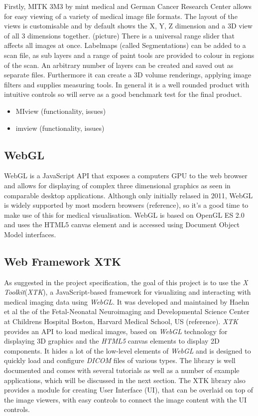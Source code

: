 \documentclass[a4paper,11pt,titlepage]{article}
\begin{document}
     Firstly, MITK 3M3 by mint medical and German Cancer Research Center allows for easy viewing of a variety of medical image file formats. The layout of the views is customisable and by default shows the X, Y, Z dimension and a 3D view of all 3 dimensions together. (picture) There is a universal range slider that affects all images at once. Labelmaps (called Segmentations) can be added to a scan file, as sub layers and a range of paint tools are provided to colour in regions of the scan. An arbitrary number of layers can be created and saved out as separate files. 
     Furthermore it can create a 3D volume renderings, applying image filters and supplies measuring tools. In general it is a well rounded product with intuitive controls so will serve as a good benchmark test for the final product.
    \begin{itemize}
\item MIview (functionality, issues)
\item imview (functionality, issues)
\end{itemize}


\subsection{WebGL}

WebGL is a JavaScript API that exposes a computers GPU to the web browser and allows for displaying of complex three dimensional graphics as seen in comparable desktop applications. Although only initially relased in 2011, WebGL is widely supported by most modern browsers (reference), so it's a good time to make use of this for medical visualisation. WebGL is based on OpenGL ES 2.0 and uses the HTML5 canvas element and is accessed using Document Object Model interfaces.

\subsection{Web Framework XTK}

As suggested in the project specification, the goal of this project is to use the \textit{X Toolkit}(\textit{XTK}), a JavaScript-based framework for visualizing and interacting with medical imaging data using \textit{WebGL}. It was developed and maintained by Haehn et al the of the Fetal-Neonatal Neuroimaging and Developmental Science Center at Childrens Hospital Boston, Harvard Medical School, US (reference). \textit{XTK} provides an API to load medical images, based on \textit{WebGL} technology for displaying 3D graphics and the \textit{HTML5} canvas elements to display 2D components. It hides a lot of the low-level elements of \textit{WebGL} and is designed to quickly load and configure \textit{DICOM} files of various types. The library is well documented and comes with several tutorials as well as a number of example applications, which will be discussed in the next section.
The XTK library also provides a module for creating User Interface (UI), that can be overlaid on top of the image viewers, with easy controls to connect the image content with the UI controls.
\end{document}

